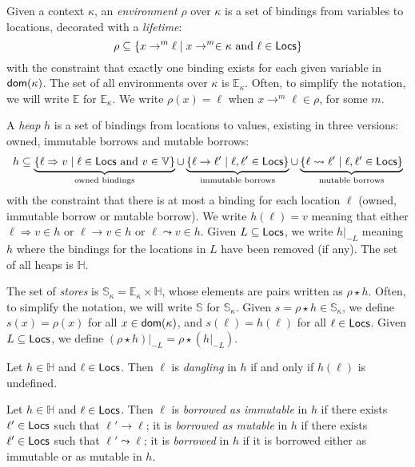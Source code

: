\begin{definition}[Domains]\label{def:domains}
  Given a context $\kappa$, an \emph{environment} $\rho$ over $\kappa$
  is a set of bindings from variables to locations, decorated with a \emph{lifetime}:
  \[
  \rho\subseteq\{x\to^m\ell\mid x\to^m\in\kappa\text{ and }\ell\in\mathsf{Locs}\}
  \]
  with the constraint that exactly one binding exists for each given variable in $\mathsf{dom}(\kappa)$.
  The set of all environments over $\kappa$ is $\mathbb{E}_\kappa$.
  Often, to simplify the notation, we will write $\mathbb{E}$ for $\mathbb{E}_\kappa$.
  We write $\rho(x)=\ell$ when $x\to^m\ell\in\rho$, for some $m$.

  A \emph{heap} $h$ is a set of bindings from locations to values,
  existing in three versions: owned, immutable borrows and mutable borrows:
  \[
  h\subseteq
  \underbrace{\{\ell\Rightarrow v\mid\ell\in\mathsf{Locs}\text{ and }v\in\mathbb{V}\}}_{\text{owned bindings}}
  \cup
  \underbrace{\{\ell\to\ell'\mid\ell,\ell'\in\mathsf{Locs}\}}_{\text{immutable borrows}}
  \cup
  \underbrace{\{\ell\leadsto\ell'\mid\ell,\ell'\in\mathsf{Locs}\}}_{\text{mutable borrows}}
  \]
  with the constraint that there is at most a binding for each
  location $\ell$ (owned, immutable borrow or mutable borrow). We write $h(\ell)=v$ meaning that
  either $\ell\Rightarrow v\in h$ or $\ell\to v\in h$ or $\ell\leadsto v\in h$.
  Given $L\subseteq\mathsf{Locs}$,
  we write $h|_{-L}$ meaning $h$ where the bindings for the locations in $L$
  have been removed (if any).
  The set of all heaps is $\mathbb{H}$.

  The set of \emph{stores} is $\mathbb{S}_\kappa=\mathbb{E}_\kappa\times\mathbb{H}$,
  whose elements are pairs written as $\rho\star h$.
  Often, to simplify the notation, we will write $\mathbb{S}$ for $\mathbb{S}_\kappa$.
  Given $s=\rho\star h\in\mathbb{S}_\kappa$, we define $s(x)=\rho(x)$ for all
  $x\in\mathsf{dom}(\kappa)$, and $s(\ell)=h(\ell)$ for all $\ell\in\mathsf{Locs}$.
  Given $L\subseteq\mathsf{Locs}$, we define $(\rho\star h)|_{-L}=\rho\star(h|_{-L})$.
\end{definition}

\begin{definition}\label{def:dangling}
  Let $h\in\mathbb{H}$ and $\ell\in\mathsf{Locs}$. Then $\ell$ is \emph{dangling} in $h$ if
  and only if $h(\ell)$ is undefined.
\end{definition}

\begin{definition}\label{def:borrow}
  Let $h\in\mathbb{H}$ and $\ell\in\mathsf{Locs}$.
  Then $\ell$ is \emph{borrowed as immutable} in $h$
  if there exists $\ell'\in\mathsf{Locs}$ such that $\ell'\to\ell$;
  it is \emph{borrowed as mutable} in $h$
  if there exists $\ell'\in\mathsf{Locs}$ such that $\ell'\leadsto\ell$;
  it is \emph{borrowed} in $h$
  if it is borrowed either as immutable or as mutable in $h$.
\end{definition}

